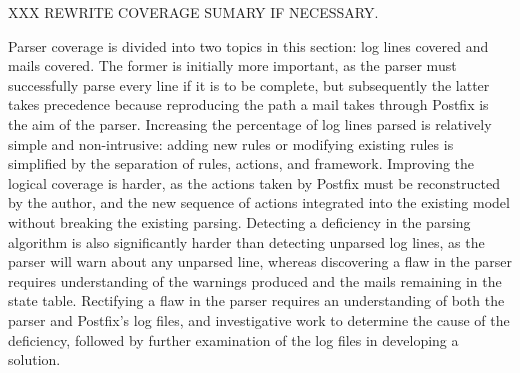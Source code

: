 XXX REWRITE COVERAGE SUMARY IF NECESSARY\@.

Parser coverage is divided into two topics in this section: log lines
covered and mails covered.  The former is initially more important, as the
parser must successfully parse every line if it is to be complete, but
subsequently the latter takes precedence because reproducing the path a
mail takes through Postfix is the aim of the parser.  Increasing the
percentage of log lines parsed is relatively simple and non-intrusive:
adding new rules or modifying existing rules is simplified by the
separation of rules, actions, and framework.  Improving the logical
coverage is harder, as the actions taken by Postfix must be reconstructed
by the author, and the new sequence of actions integrated into the existing
model without breaking the existing parsing.  Detecting a deficiency in the
parsing algorithm is also significantly harder than detecting unparsed log
lines, as the parser will warn about any unparsed line, whereas discovering
a flaw in the parser requires understanding of the warnings produced and
the mails remaining in the state table.  Rectifying a flaw in the parser
requires an understanding of both the parser and Postfix's log files, and
investigative work to determine the cause of the deficiency, followed by
further examination of the log files in developing a solution.

